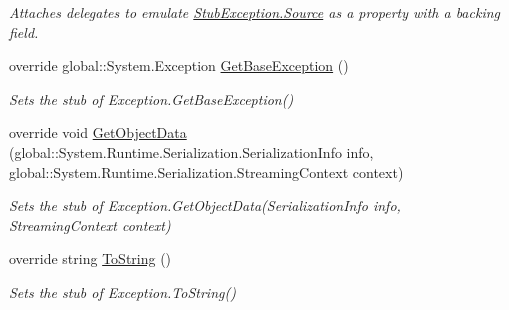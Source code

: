 \begin{DoxyCompactItemize}
\begin{DoxyCompactList}\small\item\em Attaches delegates to emulate \hyperlink{class_system_1_1_fakes_1_1_stub_exception_a648b4d26ac133e789385c4470c6bd4fb}{Stub\-Exception.\-Source} as a property with a backing field.\end{DoxyCompactList}\item 
override global\-::\-System.\-Exception \hyperlink{class_system_1_1_fakes_1_1_stub_exception_a58eab286c0b59bc365fb79c355872181}{Get\-Base\-Exception} ()
\begin{DoxyCompactList}\small\item\em Sets the stub of Exception.\-Get\-Base\-Exception()\end{DoxyCompactList}\item 
override void \hyperlink{class_system_1_1_fakes_1_1_stub_exception_ab6e408a52e3ccc7472205928b45f7833}{Get\-Object\-Data} (global\-::\-System.\-Runtime.\-Serialization.\-Serialization\-Info info, global\-::\-System.\-Runtime.\-Serialization.\-Streaming\-Context context)
\begin{DoxyCompactList}\small\item\em Sets the stub of Exception.\-Get\-Object\-Data(\-Serialization\-Info info, Streaming\-Context context)\end{DoxyCompactList}\item 
override string \hyperlink{class_system_1_1_fakes_1_1_stub_exception_a18a171ac9b6e21e13653a9364a0145b7}{To\-String} ()
\begin{DoxyCompactList}\small\item\em Sets the stub of Exception.\-To\-String()\end{DoxyCompactList}\end{DoxyCompactItemize}
